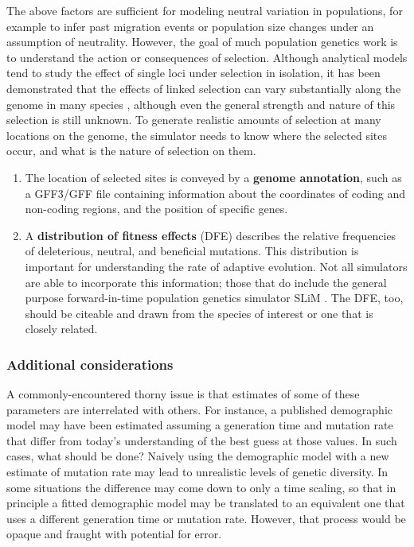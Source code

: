 \documentclass[hidelinks]{article}
\begin{document}
The above factors are sufficient for modeling neutral variation in
populations, for example to infer past migration events or population
size changes under an assumption of neutrality. However, the goal of
much population genetics work is to understand the action or
consequences of selection. Although analytical models tend to study the
effect of single loci under selection in isolation, it has been
demonstrated that the effects of linked selection can vary substantially
along the genome in many species \citep{Wolf2017}, although even the general
strength and nature of this selection is still unknown. To generate
realistic amounts of selection at many locations on the genome, the
simulator needs to know where the selected sites occur, and what is the
nature of selection on them.

\begin{enumerate}
\def\labelenumi{\arabic{enumi}.}
\setcounter{enumi}{5}
\item
  The location of selected sites is conveyed by a \textbf{genome
  annotation}, such as a GFF3/GFF file containing
  information about the coordinates of coding and non-coding regions,
  and the position of specific genes.
\item
  A \textbf{distribution of fitness effects} (DFE) describes the relative
  frequencies of deleterious, neutral, and beneficial mutations. This
  distribution is important for understanding the rate of adaptive
  evolution. Not all simulators are able to incorporate this
  information; those that do include the general purpose forward-in-time
  population genetics simulator SLiM \citep{Haller2019}. The DFE,
  too, should be citeable and drawn from the species of interest or one
  that is closely related.
\end{enumerate}

\hypertarget{additional-considerations}{%
\subsubsection*{Additional
considerations}\label{additional-considerations}}

A commonly-encountered thorny issue is that estimates of some of these
parameters are interrelated with others. For instance, a published
demographic model may have been estimated assuming a generation time and
mutation rate that differ from today's understanding of the best guess
at those values. In such cases, what should be done? Naively using the
demographic model with a new estimate of mutation rate may lead to
unrealistic levels of genetic diversity. In some situations the
difference may come down to only a time scaling, so that in principle a
fitted demographic model may be translated to an equivalent one that
uses a different generation time or mutation rate. However, that process
would be opaque and fraught with potential for error.
\end{document}
